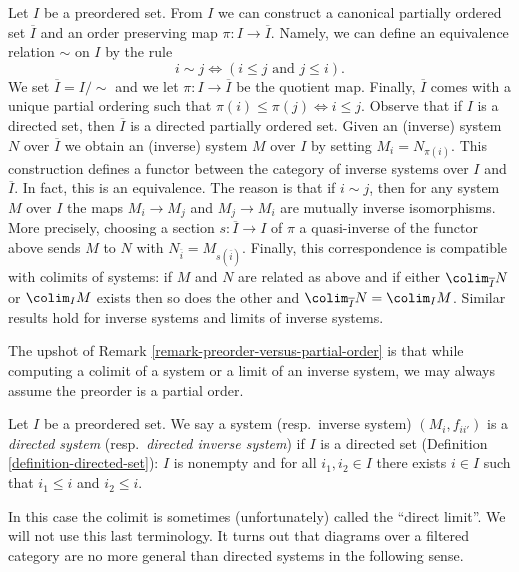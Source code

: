 \begin{remark}
\label{remark-preorder-versus-partial-order}
Let $I$ be a preordered set. From $I$ we can construct a canonical
partially ordered set $\overline{I}$ and an order preserving map
$\pi : I \to \overline{I}$. Namely, we can define an equivalence
relation $\sim$ on $I$ by the rule
$$
i \sim j \Leftrightarrow (i \leq j\text{ and }j \leq i).
$$
We set $\overline{I} = I/\sim$ and we let $\pi : I \to \overline{I}$
be the quotient map. Finally, $\overline{I}$ comes with a unique
partial ordering such that
$\pi(i) \leq \pi(j) \Leftrightarrow i \leq j$.
Observe that if $I$ is a directed set, then $\overline{I}$
is a directed partially ordered set.
Given an (inverse) system $N$ over $\overline{I}$ we obtain an
(inverse) system $M$ over $I$ by setting $M_i = N_{\pi(i)}$.
This construction defines a functor between the category
of inverse systems over $I$ and $\overline{I}$.
In fact, this is an equivalence.
The reason is that if $i \sim j$, then for any system
$M$ over $I$ the maps $M_i \to M_j$ and $M_j \to M_i$ are
mutually inverse isomorphisms. More precisely, choosing
a section $s : \overline{I} \to I$ of $\pi$ a quasi-inverse
of the functor above sends $M$ to $N$ with
$N_{\overline{i}} = M_{s(\overline{i})}$.
Finally, this correspondence is compatible with colimits of systems:
if $M$ and $N$ are related as above and
if either $\colim_{\overline{I}} N$ or $\colim_I M$ exists
then so does the other and
$\colim_{\overline{I}} N = \colim_I M$.
Similar results hold for inverse systems and limits of inverse systems.
\end{remark}

\noindent
The upshot of Remark \ref{remark-preorder-versus-partial-order}
is that while computing a colimit of a system or a limit of
an inverse system, we may always assume the preorder is a partial order.

\begin{definition}
\label{definition-directed-system}
Let $I$ be a preordered set. We say a system (resp.\ inverse system)
$(M_i, f_{ii'})$ is a
{\it directed system} (resp.\ {\it directed inverse system})
if $I$ is a directed set
(Definition \ref{definition-directed-set}): $I$ is nonempty and
for all $i_1, i_2 \in I$ there exists $i\in I$ such that
$i_1 \leq i$ and $i_2 \leq i$.
\end{definition}

\noindent
In this case the colimit is sometimes (unfortunately)
called the ``direct limit''. We will not use this last
terminology. It turns out that diagrams over a filtered
category are no more general than directed systems in the
following sense.

